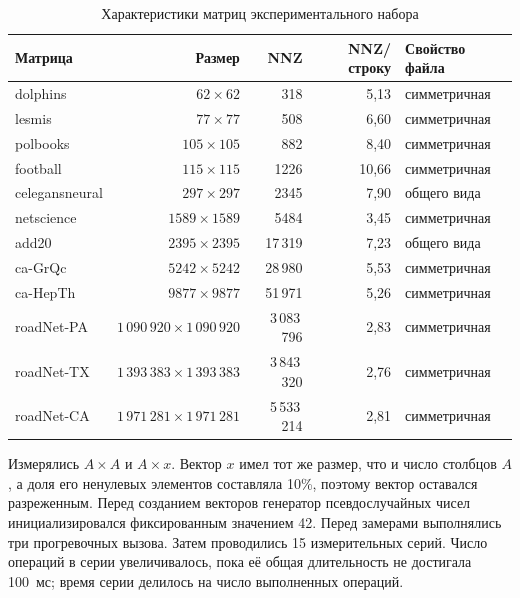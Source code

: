 \documentclass[a4paper]{article}
\begin{document}
\begin{table}[H]
\centering\scriptsize
\caption{Характеристики матриц экспериментального набора}
\label{tab:matrices}
\begin{tabular}{lrrrl}
\toprule
Матрица & Размер & NNZ & NNZ/строку & Свойство файла\\
\midrule
dolphins & $62\times62$ & 318 & 5{,}13 & симметричная\\
lesmis & $77\times77$ & 508 & 6{,}60 & симметричная\\
polbooks & $105\times105$ & 882 & 8{,}40 & симметричная\\
football & $115\times115$ & 1226 & 10{,}66 & симметричная\\
celegansneural & $297\times297$ & 2345 & 7{,}90 & общего вида\\
netscience & $1589\times1589$ & 5484 & 3{,}45 & симметричная\\
add20 & $2395\times2395$ & 17\,319 & 7{,}23 & общего вида\\
ca-GrQc & $5242\times5242$ & 28\,980 & 5{,}53 & симметричная\\
ca-HepTh & $9877\times9877$ & 51\,971 & 5{,}26 & симметричная\\
roadNet-PA & $1\,090\,920\times1\,090\,920$ & 3\,083\,796 & 2{,}83 & симметричная\\
roadNet-TX & $1\,393\,383\times1\,393\,383$ & 3\,843\,320 & 2{,}76 & симметричная\\
roadNet-CA & $1\,971\,281\times1\,971\,281$ & 5\,533\,214 & 2{,}81 & симметричная\\
\bottomrule
\end{tabular}
\end{table}

Измерялись $A\times A$ и $A\times x$. Вектор $x$ имел тот же размер, что и число столбцов $A$, а доля его ненулевых элементов составляла 10\%, поэтому вектор оставался разреженным. Перед созданием векторов генератор псевдослучайных чисел инициализировался фиксированным значением 42. Перед замерами выполнялись три прогревочных вызова. Затем проводились 15 измерительных серий. Число операций в серии увеличивалось, пока её общая длительность не достигала 100~мс; время серии делилось на число выполненных операций.
\end{document}
